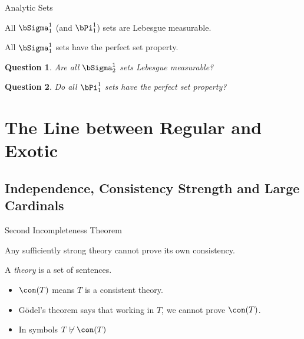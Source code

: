 \documentclass{beamer}
\newtheorem*{question}{Question}
\begin{document}
\begin{frame}{Analytic Sets}

\begin{theorem}[Luzin, 1917]
All $\bSigma^1_1$ (and $\bPi^1_1$) sets are Lebesgue measurable.
\end{theorem}

\begin{theorem}[Suslin, 197]
All $\bSigma^1_1$  sets have the perfect set property.
\end{theorem}

\begin{question}
Are all $\bSigma^1_2$ sets Lebesgue measurable?
\end{question}

\begin{question}
Do all $\bPi^1_1$ sets have the perfect set property?
\end{question}

\end{frame}

\section{The Line between Regular and Exotic}

\subsection{Independence, Consistency Strength and Large Cardinals}

\begin{frame}{Second Incompleteness Theorem}
\begin{theorem}
Any sufficiently strong theory cannot prove its own consistency.
\end{theorem}

\begin{definition}
A \emph{theory} is a set of sentences.
\end{definition}

\begin{itemize}
\item $\con(T)$ means $T$ is a consistent theory.
\item G\"{o}del's theorem says that working in $T$, we cannot prove $\con(T)$.
\item In symbols $T\not\vdash\con(T)$
\end{itemize}

\end{frame}
\end{document}
